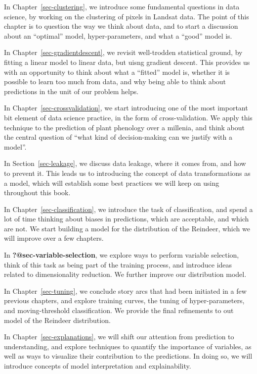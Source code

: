\documentclass[
  letterpaper,
]{scrbook}
\begin{document}
In Chapter~\ref{sec-clustering}, we introduce some fundamental questions
in data science, by working on the clustering of pixels in Landsat data.
The point of this chapter is to question the way we think about data,
and to start a discussion about an ``optimal'' model, hyper-parameters,
and what a ``good'' model is.

In Chapter~\ref{sec-gradientdescent}, we revisit well-trodden
statistical ground, by fitting a linear model to linear data, but uisng
gradient descent. This provides us with an opportunity to think about
what a ``fitted'' model is, whether it is possible to learn too much
from data, and why being able to think about predictions in the unit of
our problem helps.

In Chapter~\ref{sec-crossvalidation}, we start introducing one of the
most important bit element of data science practice, in the form of
cross-validation. We apply this technique to the prediction of plant
phenology over a millenia, and think about the central question of
``what kind of decision-making can we justify with a model''.

In Section~\ref{sec-leakage}, we discuss data leakage, where it comes
from, and how to prevent it. This leads us to introducing the concept of
data transformations as a model, which will establish some best
practices we will keep on using throughout this book.

In Chapter~\ref{sec-classification}, we introduce the task of
classification, and spend a lot of time thinking about biases in
predictions, which are acceptable, and which are not. We start building
a model for the distribution of the Reindeer, which we will improve over
a few chapters.

In \textbf{?@sec-variable-selection}, we explore ways to perform
variable selection, think of this task as being part of the training
process, and introduce ideas related to dimensionality reduction. We
further improve our distribution model.

In Chapter~\ref{sec-tuning}, we conclude story arcs that had been
initiated in a few previous chapters, and explore training curves, the
tuning of hyper-parameters, and moving-threshold classification. We
provide the final refinements to out model of the Reindeer distribution.

In Chapter~\ref{sec-explanations}, we will shift our attention from
prediction to understanding, and explore techniques to quantify the
importance of variables, as well as ways to visualize their contribution
to the predictions. In doing so, we will introduce concepts of model
interpretation and explainability.
\end{document}
